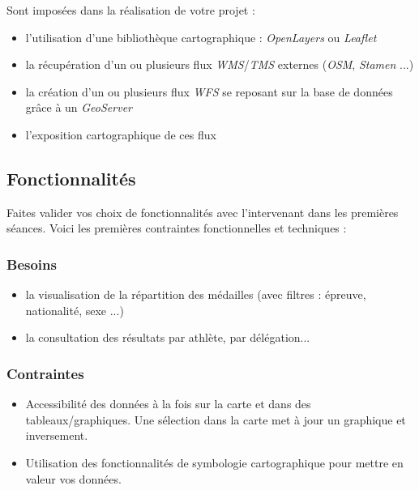 \documentclass{article}
\begin{document}
Sont imposées dans la réalisation de votre projet :

\begin{itemize}

\item l'utilisation d'une bibliothèque cartographique : \textit{OpenLayers} ou \textit{Leaflet}

\item la récupération d'un ou plusieurs flux \textit{WMS}/\textit{TMS} externes (\textit{OSM}, \textit{Stamen} ...)

\item la création d'un ou plusieurs flux \textit{WFS} se reposant sur la base de données grâce à un \textit{GeoServer}

\item l'exposition cartographique de ces flux 

\end{itemize}

\newpage

\subsection{Fonctionnalités}

Faites valider vos choix de fonctionnalités avec l'intervenant dans les premières séances. 
Voici les premières contraintes fonctionnelles et techniques :

\subsubsection{Besoins}

\begin{itemize}

\item la visualisation de la répartition des médailles (avec filtres : épreuve, nationalité, sexe ...)

\item la consultation des résultats par athlète, par délégation...

\end{itemize}

\subsubsection{Contraintes}

\begin{itemize}

\item Accessibilité des données à la fois sur la carte et dans des tableaux/graphiques. Une sélection dans la carte met à jour un graphique et inversement.

\item Utilisation des fonctionnalités de symbologie cartographique pour mettre en valeur vos données.

\end{itemize}
\end{document}
